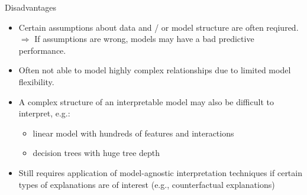 \documentclass[11pt,compress,t,notes=noshow, aspectratio=169, xcolor=table]{beamer}
\begin{document}
\begin{frame}{Disadvantages}

    \begin{itemize}
    \itemsep1em
        \item Certain assumptions about data and / or model structure are often reqiured.\\
        $\Rightarrow$ If assumptions are wrong, models may have a bad predictive performance.
        \item Often not able to model highly complex relationships due to limited model flexibility.
        \item A complex structure of an interpretable model may also be difficult to interpret, e.g.:
        \begin{itemize}
            \item linear model with hundreds of features and interactions 
            \item decision trees with huge tree depth
        \end{itemize}
        \item Still requires application of model-agnostic interpretation techniques if certain types of explanations are of interest (e.g., counterfactual explanations)
    \end{itemize}

\end{frame}
\end{document}

